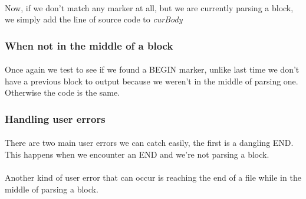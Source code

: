 \documentclass{article}
\begin{document}

\paragraph{}
Now, if we don't match any marker at all, but we are currently parsing a block,
we simply add the line of source code to \emph{curBody}


\subsubsection{When not in the middle of a block}

\paragraph{}
Once again we test to see if we found a BEGIN marker, unlike last time we don't
have a previous block to output because we weren't in the middle of parsing one.
Otherwise the code is the same.


\subsubsection{Handling user errors}

\paragraph{}
There are two main user errors we can catch easily, the first is a dangling END.
This happens when we encounter an END and we're not parsing a block.


\paragraph{}
Another kind of user error that can occur is reaching the end of a file while in
the middle of parsing a block.

\end{document}
